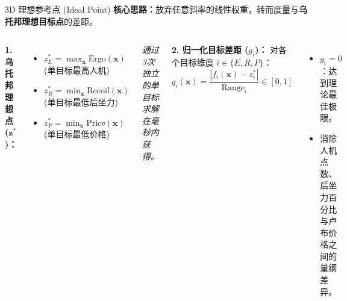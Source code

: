 \documentclass[aspectratio=169]{beamer}
\begin{document}
\begin{frame}{3D 理想参考点 (Ideal Point)}
    \textbf{核心思路：}放弃任意斜率的线性权重，转而度量与\textbf{乌托邦理想目标点}的差距。
    
    \vspace{0.3cm}
    \begin{columns}
        \textbf{1. 乌托邦理想点 ($\mathbf{z}^*$)：}
        \begin{itemize}
            \item $z^*_E = \max_{\mathbf{x}} \text{Ergo}(\mathbf{x})$ \quad (单目标最高人机)
            \item $z^*_R = \min_{\mathbf{x}} \text{Recoil}(\mathbf{x})$ \quad (单目标最低后坐力)
            \item $z^*_P = \min_{\mathbf{x}} \text{Price}(\mathbf{x})$ \quad (单目标最低价格)
        \end{itemize}
        \textit{通过3次独立的单目标求解在毫秒内获得。}

        \textbf{2. 归一化目标差距 ($g_i$)：}
        对各个目标维度 $i \in \{E, R, P\}$：
        \[
        g_i(\mathbf{x}) = \frac{|f_i(\mathbf{x}) - z^*_i|}{\text{Range}_i} \in [0, 1]
        \]
        \begin{itemize}
            \item $g_i = 0$：达到理论最佳极限。
            \item 消除人机点数、后坐力百分比与卢布价格之间的量纲差异。
        \end{itemize}
    \end{columns}
\end{frame}
\end{document}
